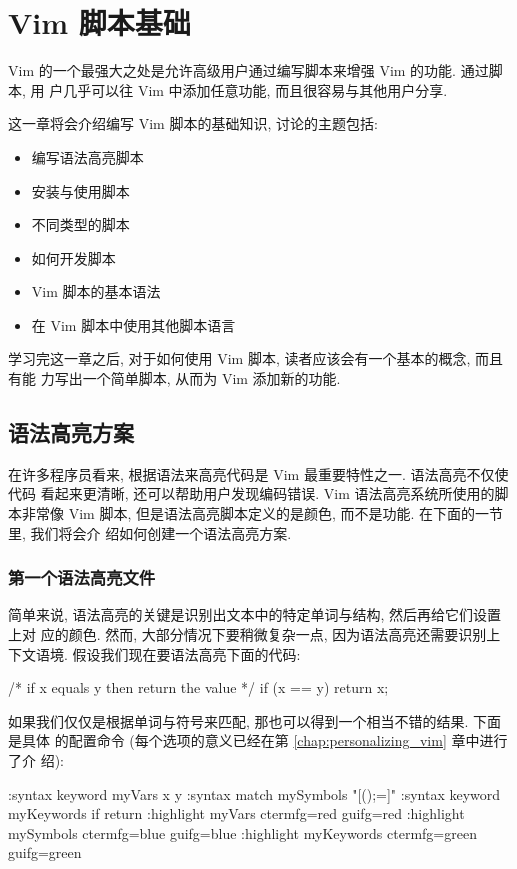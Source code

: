 \chapter{Vim 脚本基础}
\label{chap:basic_vim_scripting}

Vim 的一个最强大之处是允许高级用户通过编写脚本来增强 Vim 的功能. 通过脚本, 用
户几乎可以往 Vim 中添加任意功能, 而且很容易与其他用户分享.

这一章将会介绍编写 Vim 脚本的基础知识, 讨论的主题包括:
\begin{itemize}
    \item 编写语法高亮脚本
    \item 安装与使用脚本
    \item 不同类型的脚本
    \item 如何开发脚本
    \item Vim 脚本的基本语法
    \item 在 Vim 脚本中使用其他脚本语言
\end{itemize}

学习完这一章之后, 对于如何使用 Vim 脚本, 读者应该会有一个基本的概念, 而且有能
力写出一个简单脚本, 从而为 Vim 添加新的功能.

\section{语法高亮方案}
\label{sec:syntax_color_schemes}

在许多程序员看来, 根据语法来高亮代码是 Vim 最重要特性之一. 语法高亮不仅使代码
看起来更清晰, 还可以帮助用户发现编码错误. Vim 语法高亮系统所使用的脚本非常像
Vim 脚本, 但是语法高亮脚本定义的是颜色, 而不是功能. 在下面的一节里, 我们将会介
绍如何创建一个语法高亮方案.

\subsection{第一个语法高亮文件}
\label{subsec:your_first_syntax_color_file}

简单来说, 语法高亮的关键是识别出文本中的特定单词与结构, 然后再给它们设置上对
应的颜色. 然而, 大部分情况下要稍微复杂一点, 因为语法高亮还需要识别上下文语境.
假设我们现在要语法高亮下面的代码:
\begin{vimcode}
/* if x equals y then return the value */
if (x == y)
  {
    return x;
  }
\end{vimcode}

如果我们仅仅是根据单词与符号来匹配, 那也可以得到一个相当不错的结果. 下面是具体
的配置命令 (每个选项的意义已经在第 \ref{chap:personalizing_vim} 章中进行了介
绍):
\begin{vimcode}
:syntax keyword myVars x y
:syntax match mySymbols "[{}();=]"
:syntax keyword myKeywords if return
:highlight myVars ctermfg=red guifg=red
:highlight mySymbols ctermfg=blue guifg=blue
:highlight myKeywords ctermfg=green guifg=green
\end{vimcode}

